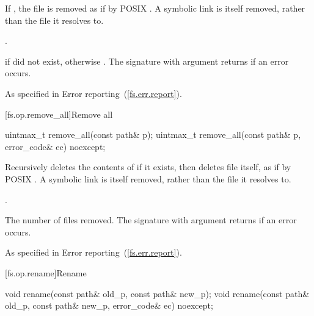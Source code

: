 \begin{itemdescr}
\pnum
\effects If , the file  is
  removed as if by POSIX .
\enternote A symbolic link is itself removed, rather than the file it
  resolves to. \exitnote

\pnum
\postcondition {}.

\pnum
\returns {} if  did not exist,
  otherwise . The signature with argument 
  returns  if an error occurs.

\pnum
\throws As specified in Error reporting~(\ref{fs.err.report}).
\end{itemdescr}


[fs.op.remove_all]{Remove all}

\begin{itemdecl}
uintmax_t remove_all(const path& p);
uintmax_t remove_all(const path& p, error_code& ec) noexcept;
\end{itemdecl}

\begin{itemdescr}
\pnum
\effects Recursively deletes the contents of  if it exists,
  then deletes file  itself, as if by POSIX .
\enternote A symbolic link is itself removed, rather than the file it
  resolves to. \exitnote

\pnum
\postcondition {}.

\pnum
\returns The number of files removed. The signature with argument
   returns  if an error
  occurs.

\pnum
\throws As specified in Error reporting~(\ref{fs.err.report}).
\end{itemdescr}


[fs.op.rename]{Rename}

\begin{itemdecl}
void rename(const path& old_p, const path& new_p);
void rename(const path& old_p, const path& new_p, error_code& ec) noexcept;
\end{itemdecl}

